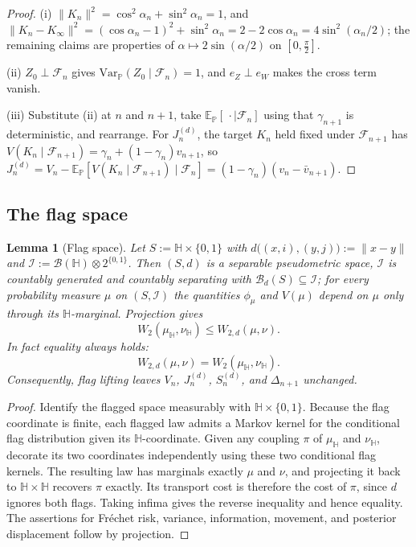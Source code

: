 \documentclass{article}
\newcommand{\Var}{\mathrm{Var}_{\mathbb{P}}}
\newcommand{\E}{\mathbb{E}_{\mathbb{P}}}
\newcommand{\F}{\mathcal{F}}
\newcommand{\I}{\mathcal{I}}
\newcommand{\B}{\mathcal{B}}
\newcommand{\1}{\mathbbm{1}}
\newtheorem{lemma}{Lemma}
\begin{document}
\begin{proof}
(i) $\|K_n\|^2=\cos^2\!\alpha_n+\sin^2\!\alpha_n=1$, and
$\|K_n-K_\infty\|^2=(\cos\alpha_n-1)^2+\sin^2\!\alpha_n=2-2\cos\alpha_n=4\sin^2(\alpha_n/2)$; the
remaining claims are properties of $\alpha\mapsto2\sin(\alpha/2)$ on $[0,\tfrac{\pi}{2}]$.

(ii) $Z_0\perp\F_n$ gives $\Var(Z_0\mid\F_n)=1$, and $e_Z\perp e_W$ makes the cross term vanish.

(iii) Substitute (ii) at $n$ and $n+1$, take $\E[\,\cdot\mid\F_n]$ using that $\gamma_{n+1}$ is
deterministic, and rearrange. For $J^{(d)}_n$, the target $K_n$ held fixed under $\F_{n+1}$ has
$V(K_n\mid\F_{n+1})=\gamma_n+(1-\gamma_n)v_{n+1}$, so
$J^{(d)}_n=V_n-\E[V(K_n\mid\F_{n+1})\mid\F_n]=(1-\gamma_n)(v_n-\bar v_{n+1})$.
\end{proof}

\subsection*{The flag space}

\begin{lemma}[Flag space]
\label{flagspace}
Let $S:=\mathbb{H}\times\{0,1\}$ with $d\big((x,i),(y,j)\big):=\|x-y\|$ and
$\I:=\B(\mathbb{H})\otimes2^{\{0,1\}}$. Then $(S,d)$ is a separable pseudometric space, $\I$ is
countably generated and countably separating with $\B_d(S)\subseteq\I$; for every probability
measure $\mu$ on $(S,\I)$ the quantities $\phi_\mu$ and $V(\mu)$ depend on $\mu$ only through its
$\mathbb{H}$-marginal. Projection gives
\[
W_{2}(\mu_{\mathbb H},\nu_{\mathbb H})\le W_{2,d}(\mu,\nu).
\]
In fact equality always holds:
\[
W_{2,d}(\mu,\nu)=W_{2}(\mu_{\mathbb H},\nu_{\mathbb H}).
\]
Consequently, flag lifting leaves $V_n$, $J^{(d)}_n$, $S^{(d)}_n$, and
$\Delta_{n+1}$ unchanged.
\end{lemma}

\begin{proof}
Identify the flagged space measurably with $\mathbb H\times\{0,1\}$.
Because the flag coordinate is finite, each flagged law admits a Markov kernel
for the conditional flag distribution given its $\mathbb H$-coordinate. Given
any coupling $\pi$ of $\mu_{\mathbb H}$ and $\nu_{\mathbb H}$, decorate its two
coordinates independently using these two conditional flag kernels. The
resulting law has marginals exactly $\mu$ and $\nu$, and projecting it back to
$\mathbb H\times\mathbb H$ recovers $\pi$ exactly. Its transport cost is
therefore the cost of $\pi$, since $d$ ignores both flags. Taking infima gives
the reverse inequality and hence equality. The assertions for Fr\'echet risk,
variance, information, movement, and posterior displacement follow by
projection.
\end{proof}
\end{document}
